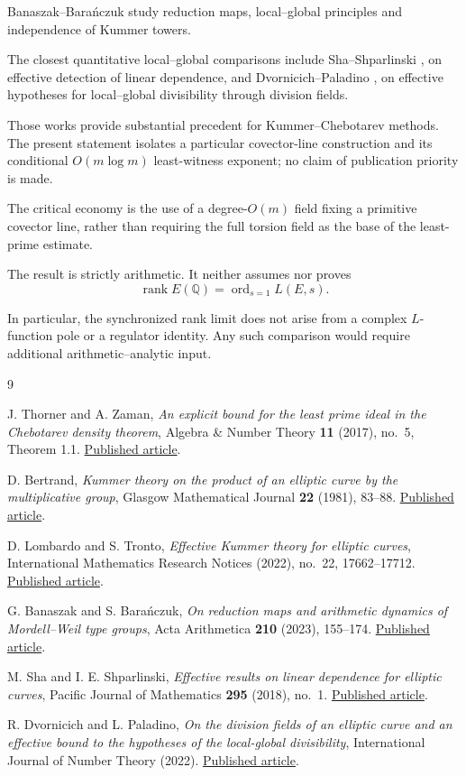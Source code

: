 \documentclass[11pt]{article}
\begin{document}
Banaszak--Bara\'nczuk
\cite{BB} study reduction maps,
local--global principles and
independence of Kummer towers.

The closest quantitative local--global
comparisons include Sha--Shparlinski
\cite{SS}, on effective detection of
linear dependence, and
Dvornicich--Paladino \cite{DP}, on
effective hypotheses for local--global
divisibility through division fields.

Those works provide substantial
precedent for Kummer--Chebotarev
methods. The present statement isolates
a particular covector-line construction
and its conditional $O(m\log m)$
least-witness exponent; no claim of
publication priority is made.

The critical economy is the use of a
degree-$O(m)$ field fixing a primitive
covector line, rather than requiring
the full torsion field as the base of
the least-prime estimate.

The result is strictly arithmetic.
It neither assumes nor proves
\[
\operatorname{rank}E(\mathbb Q)
=
\operatorname{ord}_{s=1}L(E,s).
\]

In particular, the synchronized rank
limit does not arise from a complex
$L$-function pole or a regulator
identity. Any such comparison would
require additional arithmetic--analytic
input.

\begin{thebibliography}{9}

J. Thorner and A. Zaman,
\emph{An explicit bound for the least prime
ideal in the Chebotarev density theorem},
Algebra \& Number Theory \textbf{11}
(2017), no.~5, Theorem 1.1.
\href{https://doi.org/10.2140/ant.2017.11.1135}{Published article}.

D. Bertrand,
\emph{Kummer theory on the product of an
elliptic curve by the multiplicative group},
Glasgow Mathematical Journal \textbf{22}
(1981), 83--88.
\href{https://doi.org/10.1017/S001708950000450X}{Published article}.

D. Lombardo and S. Tronto,
\emph{Effective Kummer theory for elliptic
curves},
International Mathematics Research Notices
(2022), no.~22, 17662--17712.
\href{https://doi.org/10.1093/imrn/rnab216}{Published article}.

G. Banaszak and S. Bara\'nczuk,
\emph{On reduction maps and arithmetic
dynamics of Mordell--Weil type groups},
Acta Arithmetica \textbf{210}
(2023), 155--174.
\href{https://doi.org/10.4064/aa220801-17-5}{Published article}.

M. Sha and I. E. Shparlinski,
\emph{Effective results on linear dependence
for elliptic curves},
Pacific Journal of Mathematics
\textbf{295} (2018), no.~1.
\href{https://doi.org/10.2140/pjm.2018.295.123}{Published article}.

R. Dvornicich and L. Paladino,
\emph{On the division fields of an elliptic
curve and an effective bound to the
hypotheses of the local-global divisibility},
International Journal of Number Theory
(2022).
\href{https://doi.org/10.1142/S1793042122500798}{Published article}.

\end{thebibliography}
\end{document}
